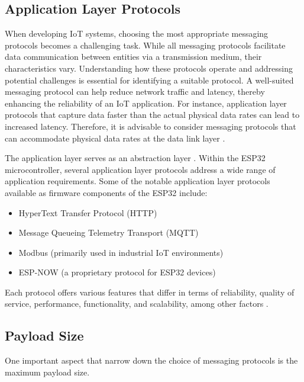 \subsection{Application Layer Protocols}
When developing \ac{IoT} systems, choosing the most appropriate
messaging protocols becomes a challenging task. While all messaging protocols facilitate data communication between entities via a transmission medium, their characteristics vary. Understanding how these protocols operate and addressing potential challenges is essential for identifying a suitable protocol. A well-suited messaging protocol can help reduce network traffic and latency, thereby enhancing the reliability of an \ac{IoT} application. For instance, application layer protocols that capture data faster than the actual physical data rates can lead to increased latency. Therefore, it is advisable to consider messaging protocols that can accommodate physical data rates at the data link layer \cite[2,15]{protocols}.

The application layer serves as an abstraction layer \cite[3]{protocols}. Within the ESP32 microcontroller, several application layer protocols address a wide range of application requirements. Some of the notable application layer protocols available as firmware components of the ESP32 include:

\begin{itemize}
    \item HyperText Transfer Protocol (HTTP) \cite{esp-prog}
    \item Message Queueing Telemetry Transport (MQTT) \cite{esp-prog}
    \item Modbus (primarily used in industrial IoT environments)\cite[3]{protocols} \cite{esp-prog}
    \item ESP-NOW (a proprietary protocol for ESP32 devices) \cite{esp-prog}\cite{esp-prog}
\end{itemize}

Each protocol offers various features that differ in terms of reliability, quality of service, performance, functionality, and scalability, among other factors \cite[3]{protocols}. 

\subsection{Payload Size}
One important aspect that narrow down the choice of messaging protocols is the maximum payload size.

